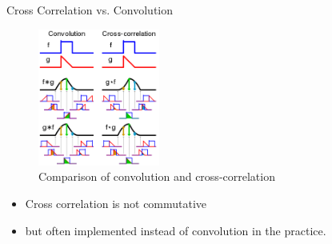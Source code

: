 \begin{vbframe}{Cross Correlation vs. Convolution}
    \begin{figure}
        \centering
        \includegraphics[width=4cm]{plots/xcorrel_animations/conv_xcorrel.png}
        \caption{Comparison of convolution and cross-correlation}
    \end{figure}
    
    \begin{itemize}
    \item Cross correlation is not commutative
    \item but often implemented instead of convolution in the practice.
    \end{itemize}
\end{vbframe}




\endlecture

